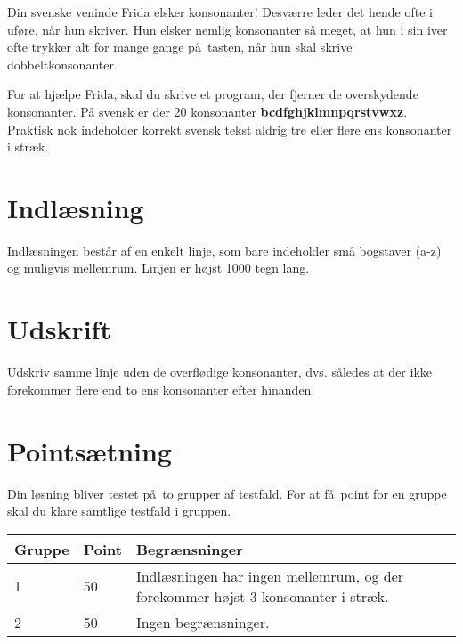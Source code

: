 Din svenske veninde Frida elsker konsonanter!
Desværre leder det hende ofte i uføre, når hun skriver.
Hun elsker nemlig konsonanter så meget, at hun i sin iver ofte trykker alt for mange gange på tasten, når hun skal skrive dobbeltkonsonanter.

For at hjælpe Frida, skal du skrive et program, der fjerner de overskydende konsonanter.
På svensk er der 20 konsonanter
\textbf{bcdfghjklmnpqrstvwxz}.
Praktisk nok indeholder korrekt svensk tekst aldrig tre eller flere ens konsonanter i stræk.

\section*{Indlæsning}
Indlæsningen består af en enkelt linje, som bare indeholder små bogstaver (a-z) og muligvis mellemrum. 
Linjen er højst 1000 tegn lang.

\section*{Udskrift}
Udskriv samme linje uden de overflødige konsonanter, dvs. således at der ikke forekommer flere end to ens konsonanter efter hinanden.

\section*{Pointsætning}

Din løsning bliver testet på to grupper af testfald.
For at få point for en gruppe skal du klare samtlige testfald i gruppen.

\noindent
\begin{tabular}{| l | l | l |}
\hline
Gruppe & Point & Begrænsninger \\ \hline
1     & 50          &  Indlæsningen har ingen mellemrum, og der forekommer højst 3 konsonanter i stræk.\\ \hline
2     & 50         &  Ingen begrænsninger. \\ \hline
\end{tabular}


